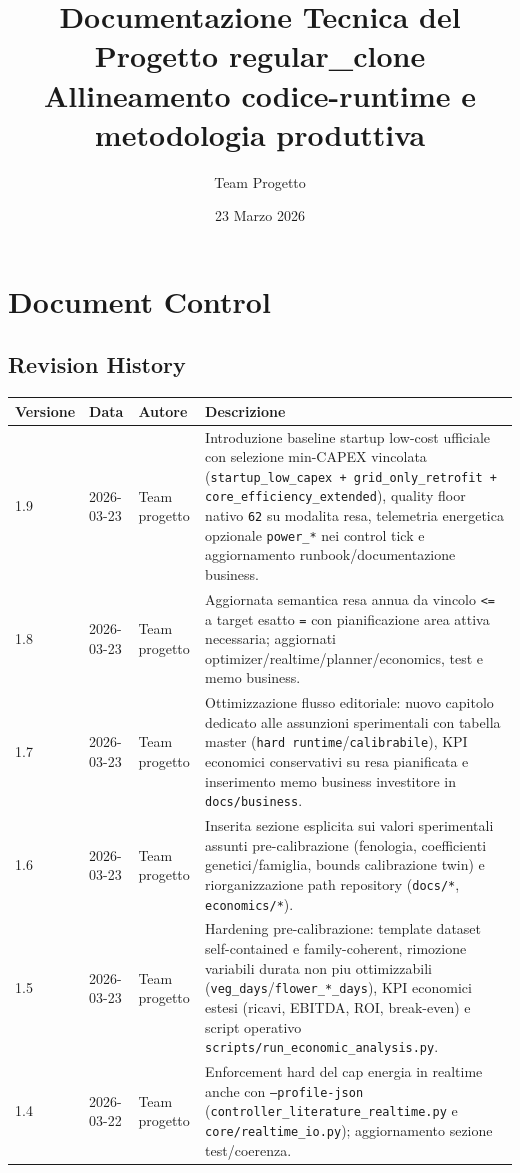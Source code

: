 ﻿\documentclass[11pt,a4paper]{report}
\title{
  \vspace{2cm}
  \textbf{Documentazione Tecnica del Progetto regular\_clone}\\
  \large Allineamento codice-runtime e metodologia produttiva
}
\author{Team Progetto}
\date{23 Marzo 2026}
\begin{document}
\maketitle
\tableofcontents
\newpage

\chapter{Document Control}

\section{Revision History}
\begin{longtable}{@{}p{2.2cm}p{2.2cm}p{3.6cm}p{6.8cm}@{}}
\toprule
Versione & Data & Autore & Descrizione \\ \midrule
1.9 & 2026-03-23 & Team progetto & Introduzione baseline startup low-cost ufficiale con selezione min-CAPEX vincolata (\texttt{startup\_low\_capex + grid\_only\_retrofit + core\_efficiency\_extended}), quality floor nativo \texttt{62} su modalita resa, telemetria energetica opzionale \texttt{power\_*} nei control tick e aggiornamento runbook/documentazione business. \\
1.8 & 2026-03-23 & Team progetto & Aggiornata semantica resa annua da vincolo \texttt{<=} a target esatto \texttt{=} con pianificazione area attiva necessaria; aggiornati optimizer/realtime/planner/economics, test e memo business. \\
1.7 & 2026-03-23 & Team progetto & Ottimizzazione flusso editoriale: nuovo capitolo dedicato alle assunzioni sperimentali con tabella master (\texttt{hard runtime}/\texttt{calibrabile}), KPI economici conservativi su resa pianificata e inserimento memo business investitore in \texttt{docs/business}. \\
1.6 & 2026-03-23 & Team progetto & Inserita sezione esplicita sui valori sperimentali assunti pre-calibrazione (fenologia, coefficienti genetici/famiglia, bounds calibrazione twin) e riorganizzazione path repository (\texttt{docs/*}, \texttt{economics/*}). \\
1.5 & 2026-03-23 & Team progetto & Hardening pre-calibrazione: template dataset self-contained e family-coherent, rimozione variabili durata non piu ottimizzabili (\texttt{veg\_days}/\texttt{flower\_*\_days}), KPI economici estesi (ricavi, EBITDA, ROI, break-even) e script operativo \texttt{scripts/run\_economic\_analysis.py}. \\
1.4 & 2026-03-22 & Team progetto & Enforcement hard del cap energia in realtime anche con \texttt{--profile-json} (\texttt{controller\_literature\_realtime.py} e \texttt{core/realtime\_io.py}); aggiornamento sezione test/coerenza. \\

\end{longtable}
\end{document}
